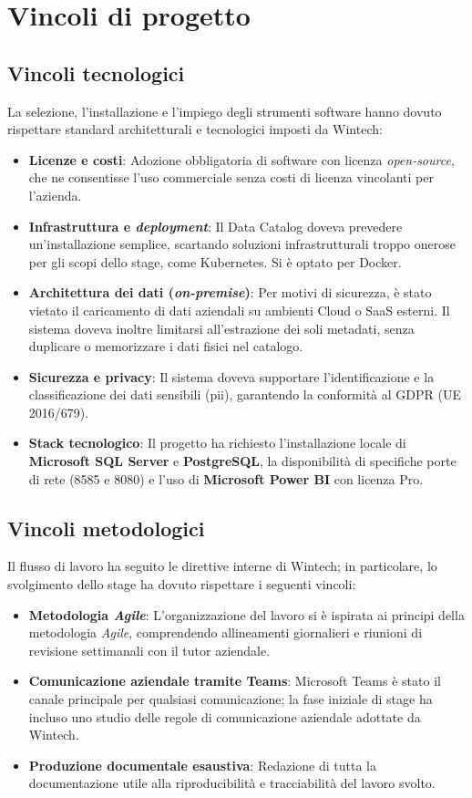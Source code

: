\section{Vincoli di progetto}
\subsection{Vincoli tecnologici}
La selezione, l'installazione e l'impiego degli strumenti software hanno dovuto rispettare standard architetturali e tecnologici imposti da Wintech:
\begin{itemize}
    \item \textbf{Licenze e costi}: Adozione obbligatoria di software con licenza \emph{open-source}, che ne consentisse l'uso commerciale senza costi di licenza vincolanti per l'azienda.
    \item \textbf{Infrastruttura e \emph{deployment}}: Il Data Catalog doveva prevedere un'installazione semplice, scartando soluzioni infrastrutturali troppo onerose per gli scopi dello stage, come Kubernetes. Si è optato per Docker.
    \item \textbf{Architettura dei dati (\emph{on-premise})}: Per motivi di sicurezza, è stato vietato il caricamento di dati aziendali su ambienti Cloud o SaaS esterni. Il sistema doveva inoltre limitarsi all'estrazione dei soli metadati, senza duplicare o memorizzare i dati fisici nel catalogo.
    \item \textbf{Sicurezza e privacy}: Il sistema doveva supportare l'identificazione e la classificazione dei dati sensibili (\gls{pii}), garantendo la conformità al GDPR (UE 2016/679).
    \item \textbf{Stack tecnologico}: Il progetto ha richiesto l'installazione locale di \textbf{Microsoft SQL Server} e \textbf{PostgreSQL}, la disponibilità di specifiche porte di rete (8585 e 8080) e l'uso di \textbf{Microsoft Power BI} con licenza Pro.
\end{itemize}

\subsection{Vincoli metodologici}
Il flusso di lavoro ha seguito le direttive interne di Wintech; in particolare, lo svolgimento dello stage ha dovuto rispettare i seguenti vincoli:
\begin{itemize}
    \item \textbf{Metodologia \emph{Agile}}: L'organizzazione del lavoro si è ispirata ai principi della metodologia \emph{Agile}, comprendendo allineamenti giornalieri e riunioni di revisione settimanali con il tutor aziendale.
    \item \textbf{Comunicazione aziendale tramite Teams}: Microsoft Teams è stato il canale principale per qualsiasi comunicazione; la fase iniziale di stage ha incluso uno studio delle regole di comunicazione aziendale adottate da Wintech.
    \item \textbf{Produzione documentale esaustiva}: Redazione di tutta la documentazione utile alla riproducibilità e tracciabilità del lavoro svolto.
\end{itemize}

